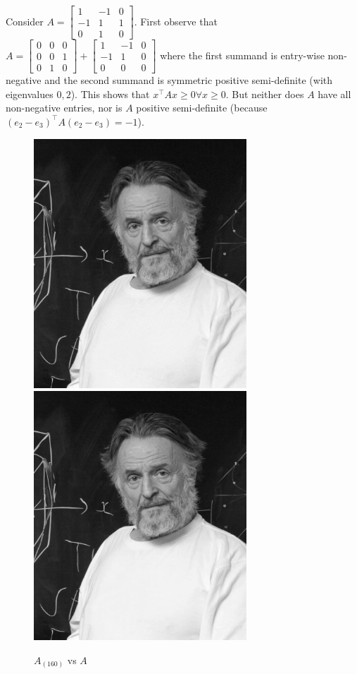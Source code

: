 \begin{enumerate}[leftmargin=*, label=(\alph*)]
Consider $A = \begin{bmatrix}1&-1&0\\-1&1&1\\0&1&0\end{bmatrix}$. First observe that $A = \begin{bmatrix}0&0&0\\0&0&1\\0&1&0\end{bmatrix} + \begin{bmatrix}1&-1&0\\-1&1&0\\0&0&0\end{bmatrix}$ where the first summand is entry-wise non-negative and the second summand is symmetric positive semi-definite (with eigenvalues $0,2$). This shows that $x^\top Ax\geq 0\forall x\geq 0$. But neither does $A$ have all non-negative entries, nor is $A$ positive semi-definite (because $(e_2-e_3)^\top A(e_2-e_3) = -1$).
\end{enumerate}

{}
\begin{figure}[t]
\includegraphics[width=8cm]{A160.jpg}
\includegraphics[width=8cm]{original.jpg}
\caption{$A_{(160)}$ vs $A$}
\label{fig:figr}
\centering
\end{figure}


